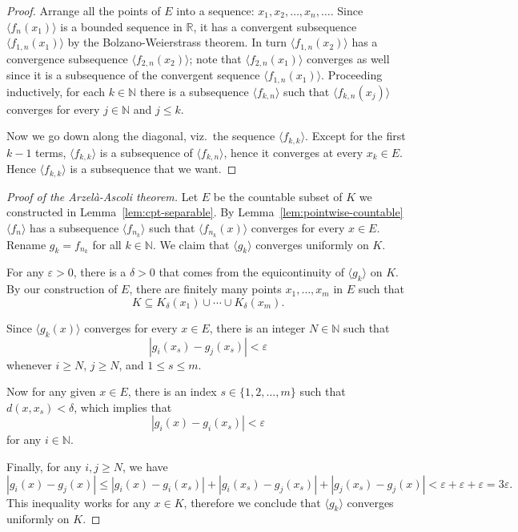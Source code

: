 \documentclass[11pt]{article}
\begin{document}
\begin{proof}
  Arrange all the points of $E$ into a sequence: $x_1, x_2, \dots, x_n, \dots$.
  Since $\langle f_n(x_1) \rangle$ is a bounded sequence in $\mathbb{R}$, it has a convergent subsequence $\langle f_{1,n}(x_1) \rangle$ by the Bolzano-Weierstrass theorem.
  In turn $\langle f_{1,n}(x_2) \rangle$ has a convergence subsequence $\langle f_{2,n}(x_2) \rangle$; note that $\langle f_{2,n}(x_1) \rangle$ converges as well since it is a subsequence of the convergent sequence $\langle f_{1,n}(x_1) \rangle$.
  Proceeding inductively, for each $k \in \mathbb{N}$ there is a subsequence $\langle f_{k,n} \rangle$ such that $\langle f_{k,n}(x_j) \rangle$ converges for every $j \in \mathbb{N}$ and $j \leqslant k$.

  Now we go down along the diagonal, viz.\ the sequence $\langle f_{k,k} \rangle$.  Except for the first $k-1$ terms, $\langle f_{k,k} \rangle$ is a subsequence of $\langle f_{k,n} \rangle$, hence it converges at every $x_k \in E$.  Hence $\langle f_{k,k} \rangle$ is a subsequence that we want.
\end{proof}

\begin{proof}[Proof of the Arzel\`a-Ascoli theorem]
  Let $E$ be the countable subset of $K$ we constructed in Lemma~\ref{lem:cpt-separable}.
  By Lemma~\ref{lem:pointwise-countable} $\langle f_n \rangle$ has a subsequence $\langle f_{n_k} \rangle$ such that $\langle f_{n_k}(x) \rangle$ converges for every $x \in E$.
  Rename $g_k = f_{n_k}$ for all $k \in \mathbb{N}$.
  We claim that $\langle g_k \rangle$ converges uniformly on $K$.
 
  For any $\varepsilon > 0$, there is a $\delta > 0$ that comes from the equicontinuity of $\langle g_k \rangle$ on $K$.
  By our construction of $E$, there are finitely many points $x_1, \dots, x_m$ in $E$ such that
  \[
    K \subseteq K_\delta(x_1) \cup \cdots \cup K_\delta(x_m).
  \]
  
  Since $\langle g_k(x) \rangle$ converges for every $x \in E$, there is an integer $N \in \mathbb{N}$ such that
  \[
    |g_i(x_s) - g_j(x_s)| < \varepsilon
  \]
  whenever $i \geqslant N$, $j \geqslant N$, and $1 \leqslant s \leqslant m$.

  Now for any given $x \in E$, there is an index $s \in \{ 1, 2, \dots, m \}$ such that $d(x, x_s) < \delta$, which implies that
  \[
    |g_i(x) - g_i(x_s)| < \varepsilon
  \]
  for any $i \in \mathbb{N}$.

  Finally, for any $i, j \geqslant N$, we have
  \[
    |g_i(x) - g_j(x)| \leqslant |g_i(x) - g_i(x_s)| + |g_i(x_s) - g_j(x_s)| + |g_j(x_s) - g_j(x)| < \varepsilon + \varepsilon + \varepsilon = 3\varepsilon.
  \]
  This inequality works for any $x \in K$, therefore we conclude that $\langle g_k \rangle$ converges uniformly on $K$.
\end{proof}
\end{document}
